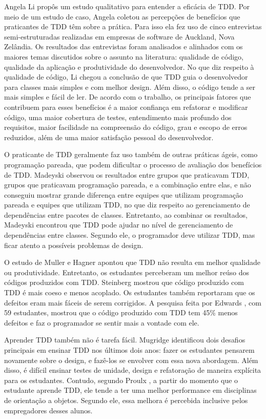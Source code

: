 Angela Li \cite{angela-li} propôs um estudo qualitativo para
entender a eficácia de TDD. Por meio de um estudo de caso, Angela coletou as 
percepções de benefícios que praticantes de TDD têm sobre a prática. Para isso ela
fez uso de cinco entrevistas semi-estruturadas realizadas em empresas de software de 
Auckland, Nova Zelândia. Os resultados das entrevistas foram analisados e alinhados
com os maiores temas discutidos sobre o assunto na literatura: qualidade de código,
qualidade da aplicação e produtividade do desenvolvedor.
No que diz respeito à qualidade de código, Li chegou a conclusão de
que TDD guia o desenvolvedor para classes mais simples e com melhor design. 
Além disso, o código tende a ser mais simples e fácil de ler.
De acordo com o trabalho, os principais fatores que contribuem para esses benefícios
é a maior confiança em refatorar e modificar código, uma maior cobertura de testes,
entendimento mais profundo dos requisitos, maior facilidade na compreensão do código,
grau e escopo de erros reduzidos, além de uma maior satisfação pessoal do desenvolvedor.

O praticante de TDD geralmente faz uso também de outras práticas ágeis, como
programação pareada, que podem dificultar o processo de avaliação dos benefícios
de TDD. Madeyski \cite{madeyski-package-dependencies} observou os resultados
entre grupos que praticavam TDD, grupos que praticavam programação pareada, 
e a combinação entre elas,
e não conseguiu mostrar grande diferença entre equipes que utilizam programação 
pareada e equipes que utilizam TDD, no que diz respeito ao gerenciamento de dependências entre 
pacotes de classes. Entretanto, ao combinar os resultados, Madeyski encontrou que TDD pode 
ajudar no nível de gerenciamento de dependências entre classes. Segundo ele, o 
programador deve utilizar TDD, mas ficar atento a possíveis problemas de design.

O estudo de Muller e Hagner \cite{muller-e-hagner} apontou que TDD não resulta
em melhor qualidade ou produtividade. Entretanto, os estudantes perceberam um 
melhor reúso dos códigos produzidos com TDD. Steinberg \cite{steinberg} mostrou
que código produzido com TDD é mais coeso e menos acoplado. Os estudantes também
reportaram que os defeitos eram mais fáceis de serem corrigidos. A pesquisa feita
por Edwards \cite{edwards}, com 59 estudantes, mostrou que o código produzido com
TDD tem 45\% menos defeitos e faz o programador se sentir mais a vontade
com ele.

Aprender TDD também não é tarefa fácil. Mugridge \cite{mugridge} identificou
dois desafios principais em ensinar TDD nos últimos dois anos: fazer os estudantes
pensarem novamente sobre o design, e fazê-los se envolver com essa nova
abordagem. Além disso, é difícil ensinar testes de unidade, design e refatoração
de maneira explícita para os estudantes. Contudo, segundo Proulx \cite{proulx}, a partir do momento que
o estudante aprende TDD, ele tende a ter uma melhor performance em disciplinas
de orientação a objetos. Segundo ele, essa melhora é percebida inclusive pelos
empregadores desses alunos. 

